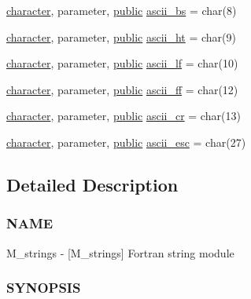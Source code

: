 \begin{DoxyCompactItemize}
\hyperlink{option__stopwatch_83_8txt_abd4b21fbbd175834027b5224bfe97e66}{character}, parameter, \hyperlink{M__stopwatch_83_8txt_a2f74811300c361e53b430611a7d1769f}{public} \hyperlink{namespacem__strings_a6d4b461b6fba6d81e0cee7b6e579c77b}{ascii\+\_\+bs} = char(8)
\item 
\hyperlink{option__stopwatch_83_8txt_abd4b21fbbd175834027b5224bfe97e66}{character}, parameter, \hyperlink{M__stopwatch_83_8txt_a2f74811300c361e53b430611a7d1769f}{public} \hyperlink{namespacem__strings_a3fef6116790e59c99f48ea31a7b00133}{ascii\+\_\+ht} = char(9)
\item 
\hyperlink{option__stopwatch_83_8txt_abd4b21fbbd175834027b5224bfe97e66}{character}, parameter, \hyperlink{M__stopwatch_83_8txt_a2f74811300c361e53b430611a7d1769f}{public} \hyperlink{namespacem__strings_a4d65d248433f7c6ea3188c558f795c23}{ascii\+\_\+lf} = char(10)
\item 
\hyperlink{option__stopwatch_83_8txt_abd4b21fbbd175834027b5224bfe97e66}{character}, parameter, \hyperlink{M__stopwatch_83_8txt_a2f74811300c361e53b430611a7d1769f}{public} \hyperlink{namespacem__strings_a52761941cc3dba4a2ed922d1b7841c90}{ascii\+\_\+ff} = char(12)
\item 
\hyperlink{option__stopwatch_83_8txt_abd4b21fbbd175834027b5224bfe97e66}{character}, parameter, \hyperlink{M__stopwatch_83_8txt_a2f74811300c361e53b430611a7d1769f}{public} \hyperlink{namespacem__strings_a1f58b48efb41665079ced6de505a3b65}{ascii\+\_\+cr} = char(13)
\item 
\hyperlink{option__stopwatch_83_8txt_abd4b21fbbd175834027b5224bfe97e66}{character}, parameter, \hyperlink{M__stopwatch_83_8txt_a2f74811300c361e53b430611a7d1769f}{public} \hyperlink{namespacem__strings_a6e9a1f921d2bb4a14a9b50a3b8f96288}{ascii\+\_\+esc} = char(27)
\end{DoxyCompactItemize}


\subsection{Detailed Description}
\subsubsection*{N\+A\+ME}

M\+\_\+strings -\/ \mbox{[}M\+\_\+strings\mbox{]} Fortran string module \subsubsection*{S\+Y\+N\+O\+P\+S\+IS}

